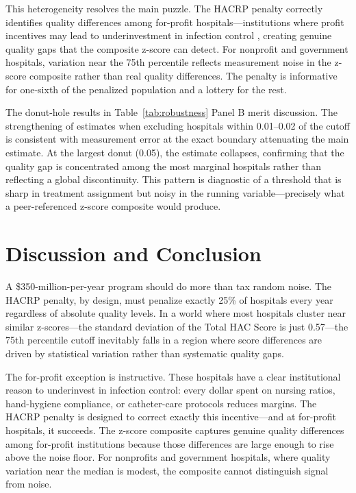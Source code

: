 \documentclass[12pt]{article}
\begin{document}


This heterogeneity resolves the main puzzle. The HACRP penalty correctly identifies quality differences among for-profit hospitals---institutions where profit incentives may lead to underinvestment in infection control \citep{gupta2021impacts}, creating genuine quality gaps that the composite z-score can detect. For nonprofit and government hospitals, variation near the 75th percentile reflects measurement noise in the z-score composite rather than real quality differences. The penalty is informative for one-sixth of the penalized population and a lottery for the rest.

The donut-hole results in Table~\ref{tab:robustness} Panel B merit discussion. The strengthening of estimates when excluding hospitals within 0.01--0.02 of the cutoff is consistent with measurement error at the exact boundary attenuating the main estimate. At the largest donut (0.05), the estimate collapses, confirming that the quality gap is concentrated among the most marginal hospitals rather than reflecting a global discontinuity. This pattern is diagnostic of a threshold that is sharp in treatment assignment but noisy in the running variable---precisely what a peer-referenced z-score composite would produce.


\section{Discussion and Conclusion}\label{sec:conclusion}

A \$350-million-per-year program should do more than tax random noise. The HACRP penalty, by design, must penalize exactly 25\% of hospitals every year regardless of absolute quality levels. In a world where most hospitals cluster near similar z-scores---the standard deviation of the Total HAC Score is just 0.57---the 75th percentile cutoff inevitably falls in a region where score differences are driven by statistical variation rather than systematic quality gaps.

The for-profit exception is instructive. These hospitals have a clear institutional reason to underinvest in infection control: every dollar spent on nursing ratios, hand-hygiene compliance, or catheter-care protocols reduces margins. The HACRP penalty is designed to correct exactly this incentive---and at for-profit hospitals, it succeeds. The z-score composite captures genuine quality differences among for-profit institutions because those differences are large enough to rise above the noise floor. For nonprofits and government hospitals, where quality variation near the median is modest, the composite cannot distinguish signal from noise.
\end{document}
